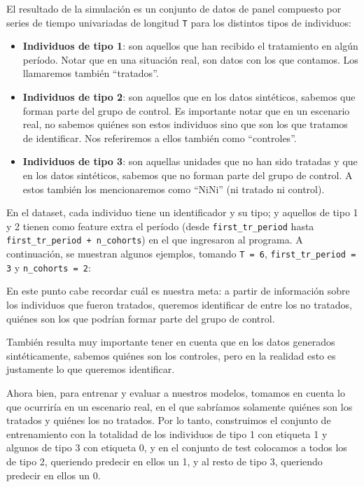 \documentclass[../main.tex]{subfiles}
\begin{document}
El resultado de la simulación es un conjunto de datos de panel compuesto por series de tiempo univariadas de longitud \texttt{T} para los distintos tipos de individuos:
\begin{itemize}
    \setlength{\itemsep}{0pt}
    \setlength{\parsep}{0pt}
    \item \textbf{Individuos de tipo 1}: son aquellos que han recibido el tratamiento en algún período. Notar que en una situación real, son datos con los que contamos. Los llamaremos también ``tratados''.
    \item \textbf{Individuos de tipo 2}: son aquellos que en los datos sintéticos, sabemos que forman parte del grupo de control. Es importante notar que en un escenario real, no sabemos quiénes son estos individuos sino que son los que tratamos de identificar. Nos referiremos a ellos también como ``controles''.
    \item \textbf{Individuos de tipo 3}: son aquellas unidades que no han sido tratadas y que en los datos sintéticos, sabemos que no forman parte del grupo de control. A estos también los mencionaremos como ``NiNi'' (ni tratado ni control). 
\end{itemize}

En el dataset, cada individuo tiene un identificador y su tipo; y aquellos de tipo 1 y 2 tienen como feature extra el período (desde \texttt{first\_tr\_period} hasta \texttt{first\_tr\_period + n\_cohorts}) en el que ingresaron al programa. A continuación, se muestran algunos ejemplos, tomando \texttt{T = 6}, \texttt{first\_tr\_period = 3} y \texttt{n\_cohorts = 2}:

En este punto cabe recordar cuál es nuestra meta: a partir de información sobre los individuos que fueron tratados, queremos identificar de entre los no tratados, quiénes son los que podrían formar parte del grupo de control.

También resulta muy importante tener en cuenta que en los datos generados sintéticamente, sabemos quiénes son los controles, pero en la realidad esto es justamente lo que queremos identificar.

Ahora bien, para entrenar y evaluar a nuestros modelos, tomamos en cuenta lo que ocurriría en un escenario real, en el que sabríamos solamente quiénes son los tratados y quiénes los no tratados. Por lo tanto, construimos el conjunto de entrenamiento con la totalidad de los individuos de tipo 1 con etiqueta 1 y algunos de tipo 3 con etiqueta 0, y en el conjunto de test colocamos a todos los de tipo 2, queriendo predecir en ellos un 1, y al resto de tipo 3, queriendo predecir en ellos un 0. 
\end{document}
